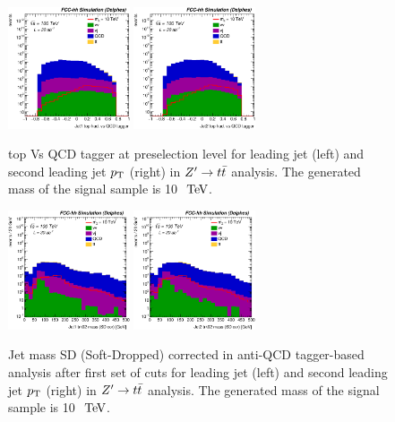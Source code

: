 \documentclass{cernrep}
\begin{document}
\begin{figure}[!htb]\centering
\includegraphics[width=0.32\textwidth]{Fig/Zptt/Jet1_thad_vs_QCD_tagger_sel0_nostack_log.eps}
\includegraphics[width=0.32\textwidth]{Fig/Zptt/Jet2_thad_vs_QCD_tagger_sel0_nostack_log.eps}
\caption{top Vs QCD tagger at preselection level for leading jet (left) and second leading jet $p\sb{\scriptstyle\mathrm{T}}$ (right) in $Z^{\prime} \rightarrow t\bar{t}$ analysis. The generated mass of the signal sample is 10 $\TeV$.}
\label{fig:Zptt_sel0_tagger}
\end{figure}

\begin{figure}[!htb]\centering
\includegraphics[width=0.32\textwidth]{Fig/Zptt/Jet1_trk02_SD_Cor_m_sel3_nostack_log.eps}
\includegraphics[width=0.32\textwidth]{Fig/Zptt/Jet2_trk02_SD_Cor_m_sel3_nostack_log.eps}
\caption{Jet mass SD (Soft-Dropped) corrected in anti-QCD tagger-based analysis after first set of cuts for leading jet (left) and second leading jet $p\sb{\scriptstyle\mathrm{T}}$ (right) in $Z^{\prime} \rightarrow t\bar{t}$ analysis. The generated mass of the signal sample is 10 $\TeV$.}
\label{fig:Zptt_sel1_tagger}
\end{figure}
\end{document}
